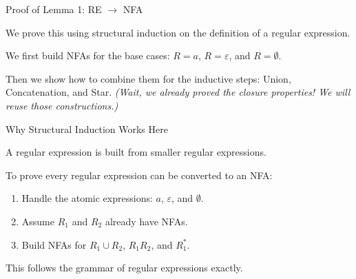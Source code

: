 \documentclass[10pt,aspectratio=169]{beamer}
\newcommand{\eps}{\varepsilon}
\begin{document}
\begin{frame}{Proof of Lemma 1: RE $\rightarrow$ NFA}

We prove this using structural induction on the definition of a regular expression. 

\vspace{1em}

We first build NFAs for the base cases:
$R=a$, $R=\eps$, and $R=\emptyset$.

\vspace{1em}

Then we show how to combine them for the inductive steps:
Union, Concatenation, and Star. 
\textit{(Wait, we already proved the closure properties! We will reuse those constructions.)}

\end{frame}


\begin{frame}{Why Structural Induction Works Here}

A regular expression is built from smaller regular expressions.

\vspace{0.8em}
To prove every regular expression can be converted to an NFA:

\vspace{0.6em}
\begin{enumerate}
    \item Handle the atomic expressions: $a$, $\eps$, and $\emptyset$.
    \item Assume $R_1$ and $R_2$ already have NFAs.
    \item Build NFAs for $R_1\cup R_2$, $R_1R_2$, and $R_1^*$.
\end{enumerate}

\vspace{0.8em}
This follows the grammar of regular expressions exactly.

\end{frame}
\end{document}
